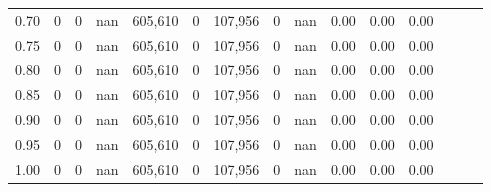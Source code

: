 \begin{tabular}{rrrrrrrrrrrrrrr}
0.70 &        0 &       0 &   nan &  605,610 &        0 &  107,956 &        0 &   nan &  0.00 &  0.00 &      0.00 \\
0.75 &        0 &       0 &   nan &  605,610 &        0 &  107,956 &        0 &   nan &  0.00 &  0.00 &      0.00 \\
0.80 &        0 &       0 &   nan &  605,610 &        0 &  107,956 &        0 &   nan &  0.00 &  0.00 &      0.00 \\
0.85 &        0 &       0 &   nan &  605,610 &        0 &  107,956 &        0 &   nan &  0.00 &  0.00 &      0.00 \\
0.90 &        0 &       0 &   nan &  605,610 &        0 &  107,956 &        0 &   nan &  0.00 &  0.00 &      0.00 \\
0.95 &        0 &       0 &   nan &  605,610 &        0 &  107,956 &        0 &   nan &  0.00 &  0.00 &      0.00 \\
1.00 &        0 &       0 &   nan &  605,610 &        0 &  107,956 &        0 &   nan &  0.00 &  0.00 &      0.00 \\
\bottomrule
\end{tabular}
